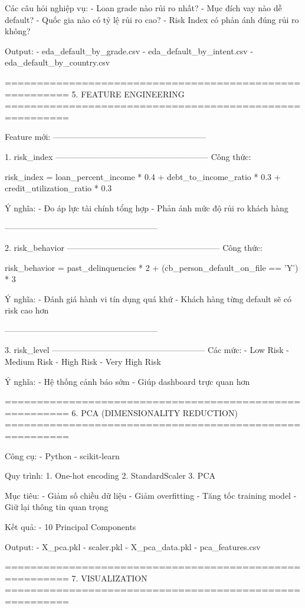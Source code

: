 Các câu hỏi nghiệp vụ:
- Loan grade nào rủi ro nhất?
- Mục đích vay nào dễ default?
- Quốc gia nào có tỷ lệ rủi ro cao?
- Risk Index có phản ánh đúng rủi ro không?

Output:
- eda_default_by_grade.csv
- eda_default_by_intent.csv
- eda_default_by_country.csv

========================================================
5. FEATURE ENGINEERING
========================================================

Feature mới:
--------------------------------------------------------

1. risk_index
--------------------------------------------------------
Công thức:

risk_index =
loan_percent_income * 0.4 +
debt_to_income_ratio * 0.3 +
credit_utilization_ratio * 0.3

Ý nghĩa:
- Đo áp lực tài chính tổng hợp
- Phản ánh mức độ rủi ro khách hàng

--------------------------------------------------------

2. risk_behavior
--------------------------------------------------------
Công thức:

risk_behavior =
past_delinquencies * 2 +
(cb_person_default_on_file == 'Y') * 3

Ý nghĩa:
- Đánh giá hành vi tín dụng quá khứ
- Khách hàng từng default sẽ có risk cao hơn

--------------------------------------------------------

3. risk_level
--------------------------------------------------------
Các mức:
- Low Risk
- Medium Risk
- High Risk
- Very High Risk

Ý nghĩa:
- Hệ thống cảnh báo sớm
- Giúp dashboard trực quan hơn

========================================================
6. PCA (DIMENSIONALITY REDUCTION)
========================================================

Công cụ:
- Python
- scikit-learn

Quy trình:
1. One-hot encoding
2. StandardScaler
3. PCA

Mục tiêu:
- Giảm số chiều dữ liệu
- Giảm overfitting
- Tăng tốc training model
- Giữ lại thông tin quan trọng

Kết quả:
- 10 Principal Components

Output:
- X_pca.pkl
- scaler.pkl
- X_pca_data.pkl
- pca_features.csv

========================================================
7. VISUALIZATION
========================================================

